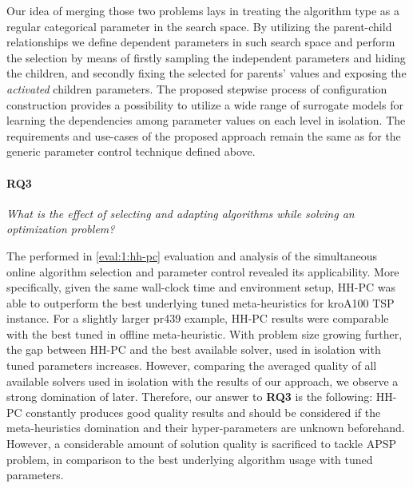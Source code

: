 Our idea of merging those two problems lays in treating the algorithm type as a regular categorical parameter in the search space. By utilizing the parent-child relationships we define dependent parameters in such search space and perform the selection by means of firstly sampling the independent parameters and hiding the children, and secondly fixing the selected for parents' values and exposing the \emph{activated} children parameters. The proposed stepwise process of configuration construction provides a possibility to utilize a wide range of surrogate models for learning the dependencies among parameter values on each level in isolation. The requirements and use-cases of the proposed approach remain the same as for the generic parameter control technique defined above.


\paragraph{RQ3} \emph{What is the effect of selecting and adapting algorithms while solving an optimization problem?}

The performed in \cref{eval:1:hh-pc} evaluation and analysis of the simultaneous online algorithm selection and parameter control revealed its applicability. More specifically, given the same wall-clock time and environment setup, HH-PC was able to outperform the best underlying tuned meta-heuristics for kroA100 TSP instance. For a slightly larger pr439 example, HH-PC results were comparable with the best tuned in offline meta-heuristic. With problem size growing further, the gap between HH-PC and the best available solver, used in isolation with tuned parameters increases. However, comparing the averaged quality of all available solvers used in isolation with the results of our approach, we observe a strong domination of later. Therefore, our answer to \textbf{RQ3} is the following: HH-PC constantly produces good quality results and should be considered if the meta-heuristics domination and their hyper-parameters are unknown beforehand. However, a considerable amount of solution quality is sacrificed to tackle APSP problem, in comparison to the best underlying algorithm usage with tuned parameters.


